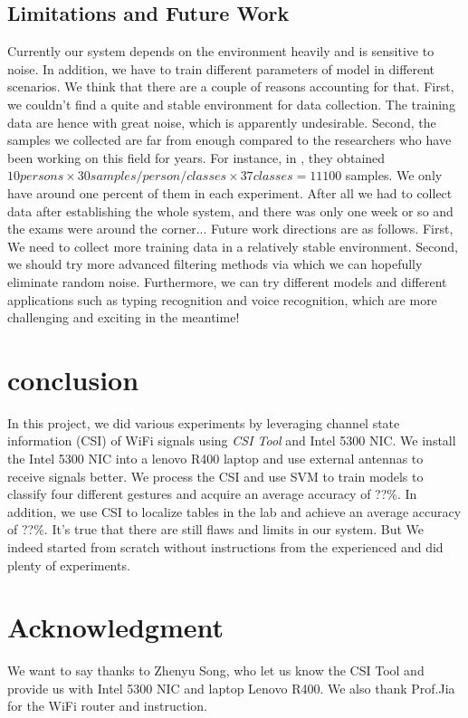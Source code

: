 \documentclass[conference]{IEEEtran}
\begin{document}
\subsection{Limitations and Future Work}
Currently our system depends on the environment heavily and is sensitive to noise. In addition, we have to train different parameters of model in different scenarios. We think that there are a couple of reasons accounting for that. 
First, we couldn't find a quite and stable environment for data collection. The training data are hence with great noise, which is apparently undesirable. 
Second, the samples we collected are far from enough compared to the researchers who have been working on this field for years. For instance, in \cite{ali2015keystroke}, they obtained $10 persons \times 30samples/person/classes \times 37classes = 11100$ samples. We only have around one percent of them in each experiment. After all we had to collect data after establishing the whole system, and there was only one week or so and the exams were around the corner...
Future work directions are as follows. First, We need to collect more training data in a relatively stable environment. Second, we should try more advanced filtering methods via which we can hopefully eliminate random noise. Furthermore, we can try different models and different applications such as typing recognition and voice recognition, which are more challenging and exciting in the meantime!

\section{conclusion} \label{section-conclusion}
In this project, we did various experiments by leveraging channel state information (CSI) of WiFi signals using \emph{CSI Tool} and Intel 5300 NIC.
We install the Intel 5300 NIC into a lenovo R400 laptop and use external antennas to receive signals better.
We process the CSI and use SVM to train models to classify four different gestures and acquire an average accuracy of ??\%.
In addition, we use CSI to localize tables in the lab and achieve an average accuracy of ??\%.
It's true that there are still flaws and limits in our system. But We indeed started from scratch without instructions from the experienced and did plenty of experiments.

\section*{Acknowledgment}
We want to say thanks to Zhenyu Song, who let us know the CSI Tool and provide us with Intel 5300 NIC and laptop Lenovo R400. We also thank Prof.Jia for the WiFi router and instruction.



\end{document}
